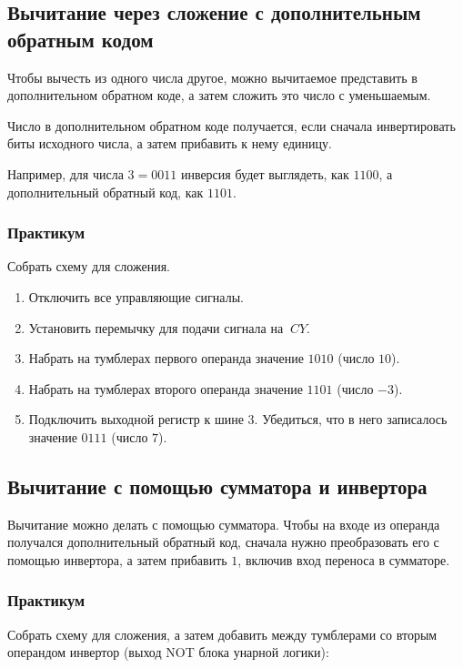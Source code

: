 \documentclass{book}
\begin{document}
\subsection{Вычитание через сложение с дополнительным обратным кодом}

Чтобы вычесть из одного числа другое, можно вычитаемое представить в дополнительном обратном
коде, а затем сложить это число с уменьшаемым.

Число в дополнительном обратном коде получается, если сначала инвертировать биты исходного
числа, а затем прибавить к нему единицу.

Например, для числа $3=0011$ инверсия будет выглядеть, как $1100$, а дополнительный обратный код, как $1101$.

\subsubsection{Практикум}

Собрать схему для сложения.

\begin{enumerate}
    \item Отключить все управляющие сигналы.
    \item Установить перемычку для подачи сигнала на $~CY$.
    \item Набрать на тумблерах первого операнда значение $1010$ (число $10$).
    \item Набрать на тумблерах второго операнда значение $1101$ (число $-3$).
    \item Подключить выходной регистр к шине $3$. Убедиться, что в него записалось значение $0111$ (число $7$).
\end{enumerate}


\subsection{Вычитание с помощью сумматора и инвертора}

Вычитание можно делать с помощью сумматора. Чтобы на входе из операнда получался дополнительный
обратный код, сначала нужно преобразовать его с помощью инвертора, а затем прибавить $1$,
включив вход переноса в сумматоре.

\subsubsection{Практикум}

Собрать схему для сложения, а затем добавить между тумблерами со вторым операндом
инвертор (выход NOT блока унарной логики):
\end{document}
